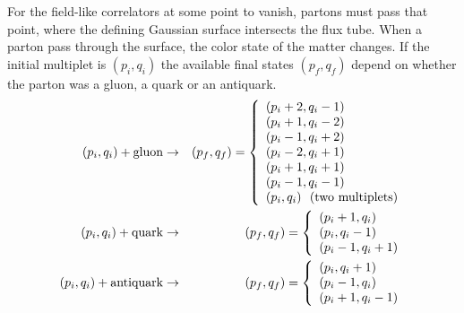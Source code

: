 \documentclass[aps, prc, 12pt, nofootinbib, showpacs, superscriptaddress, tightenlines, groupedaddress]{revtex4-2}
\begin{document}
For the field-like correlators at some point to vanish, partons must pass that point, where the defining Gaussian surface intersects the flux tube. When a parton pass through the surface, the color state of the matter changes. If the initial multiplet is $(p_i,q_i)$ the available final states $(p_f,q_f)$ depend on whether the parton was a gluon, a quark or an antiquark.
\begin{eqnarray}\label{eq:pfqflist}
(p_i,q_i)+{\rm gluon}&\rightarrow& (p_f,q_f)=\left\{
\begin{array}{l}
(p_i+2,q_i-1)\\
(p_i+1,q_i-2)\\
(p_i-1,q_i+2)\\
(p_i-2,q_i+1)\\
(p_i+1,q_i+1)\\
(p_i-1,q_i-1)\\
(p_i,q_i)~~({\rm two~multiplets})
\end{array}
\right.\\
\nonumber
(p_i,q_i)+{\rm quark}&\rightarrow& (p_f,q_f)=\left\{
\begin{array}{l}
(p_i+1,q_i)\\
(p_i,q_i-1)\\
(p_i-1,q_i+1)
\end{array}
\right.\\
\nonumber
(p_i,q_i)+{\rm antiquark}&\rightarrow& (p_f,q_f)=\left\{\begin{array}{l}
(p_i,q_i+1)\\
(p_i-1,q_i)\\
(p_i+1,q_i-1)
\end{array}
\right.
\end{eqnarray}
\end{document}

